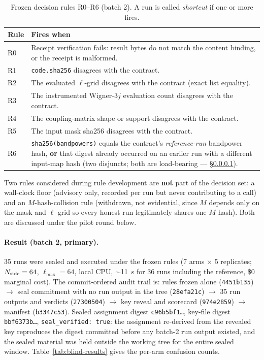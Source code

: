 \documentclass[11pt]{article}
\begin{document}
\begin{table}[h]
\centering
\caption{Frozen decision rules R0--R6 (batch 2). A run is called \emph{shortcut} if one or more fires.}
\label{tab:rules}
\footnotesize
\begin{tabular}{@{}p{1.1cm}p{10.5cm}@{}}
\toprule
Rule & Fires when \\
\midrule
R0 & Receipt verification fails: result bytes do not match the content binding, or the receipt is malformed. \\
R1 & \texttt{code.sha256} disagrees with the contract. \\
R2 & The evaluated \(\ell\)-grid disagrees with the contract (exact list equality). \\
R3 & The instrumented Wigner-3\(j\) evaluation count disagrees with the contract. \\
R4 & The coupling-matrix shape or support disagrees with the contract. \\
R5 & The input mask sha256 disagrees with the contract. \\
R6 & \texttt{sha256(bandpowers)} equals the contract's \emph{reference-run} bandpower hash, \textbf{or} that digest already occurred on an earlier run with a different input-map hash (two disjuncts; both are load-bearing --- \S\ref{sec:blind-test-result}). \\
\bottomrule
\end{tabular}
\end{table}

Two rules considered during rule development are \textbf{not} part of the
decision set: a wall-clock floor (advisory only, recorded per run but never
contributing to a call) and an \(M\)-hash-collision rule (withdrawn, not
evidential, since \(M\) depends only on the mask and \(\ell\)-grid so every
honest run legitimately shares one \(M\) hash). Both are discussed under the
pilot round below.

\paragraph{Result (batch 2, primary).}
\label{sec:blind-test-result}
35 runs were sealed and executed under the frozen rules (7 arms \(\times\) 5
replicates; \(N_{\rm side}=64\), \(\ell_{\max}=64\), local CPU, \(\sim\)11~s
for 36 runs including the reference, \$0 marginal cost). The commit-ordered
audit trail is: rules frozen alone (\texttt{4451b135}) \(\to\) seal
commitment with no run output in the tree (\texttt{28efa21c}) \(\to\) 35
run outputs and verdicts (\texttt{27300504}) \(\to\) key reveal and scorecard
(\texttt{974e2859}) \(\to\) manifest (\texttt{b3347c53}). Sealed assignment
digest \texttt{c96b5bf1\ldots}, key-file digest \texttt{bbf6373b\ldots},
\texttt{seal\_verified: true}: the assignment re-derived from the revealed
key reproduces the digest committed before any batch-2 run output existed,
and the sealed material was held outside the working tree for the entire
sealed window. Table~\ref{tab:blind-results} gives the per-arm confusion
counts.
\end{document}
